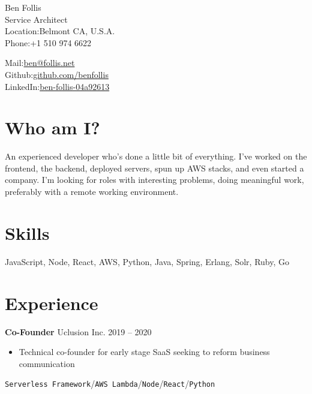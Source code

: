 \documentclass{res}
\begin{document}


{\huge Ben Follis}\\
{\huge Service Architect} \\%

Location:{Belmont CA, U.S.A.}\\
Phone:{+1 510 974 6622}\\
\vspace{-\baselineskip} %

Mail:{\href{mailto:ben@follis.net}{ben@follis.net}}\\
Github:{\href{https://github.com/benfollis}{github.com/benfollis}}\\
LinkedIn:{\href{https://www.linkedin.com/in/ben-follis-04a92613}{ben-follis-04a92613}}\\



\section{Who am I?}
An experienced developer who's done a little bit of everything. I've worked on the frontend, the backend, deployed servers, spun up AWS stacks, and even started a company. I'm looking for roles with interesting problems, doing meaningful work, preferably with a remote working environment.

\section{Skills}
JavaScript, Node, React, AWS, Python, Java, Spring, Erlang, Solr, Ruby, Go


\section{Experience}
        {\bf Co-Founder} \hfill Uclusion Inc. \hfill 2019 -- 2020
        \begin{itemize}
        \item Technical co-founder for early stage SaaS seeking to reform business communication
        \end{itemize}
        \texttt{Serverless Framework}\slash\texttt{AWS Lambda}\slash\texttt{Node}\slash\texttt{React}\slash\texttt{Python}\\
        
\end{document}
